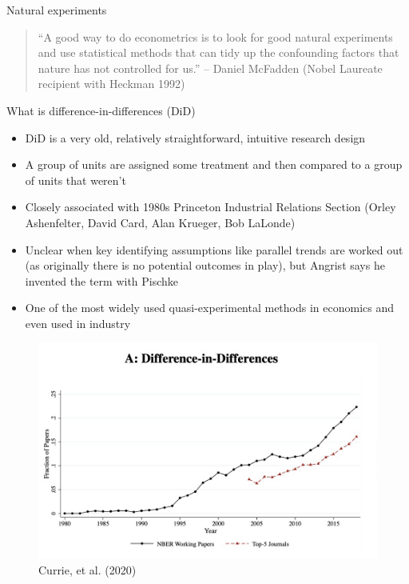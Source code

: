 \documentclass{beamer}
\begin{document}
\begin{frame}{Natural experiments}

\begin{quote}
``A good way to do econometrics is to look for good natural experiments and use statistical methods that can tidy up the confounding factors that nature has not controlled for us.'' -- Daniel McFadden (Nobel Laureate recipient with Heckman 1992)
\end{quote}

\end{frame}




\begin{frame}{What is difference-in-differences (DiD)}

\begin{itemize}
\item DiD is a very old, relatively straightforward, intuitive research design
\item A group of units are assigned some treatment and then compared to a group of units that weren't
\item Closely associated with 1980s Princeton Industrial Relations Section (Orley Ashenfelter, David Card, Alan Krueger, Bob LaLonde)
\item Unclear when key identifying assumptions like parallel trends are worked out (as originally there is no potential outcomes in play), but Angrist says he invented the term with Pischke
\item One of the most widely used quasi-experimental methods in economics and even used in industry
\end{itemize}

\end{frame}


\begin{frame}

	\begin{figure}
	\caption{Currie, et al. (2020)}
	\includegraphics[scale=0.25]{./lecture_includes/currie_did.png}
	\end{figure}


\end{frame}
\end{document}
